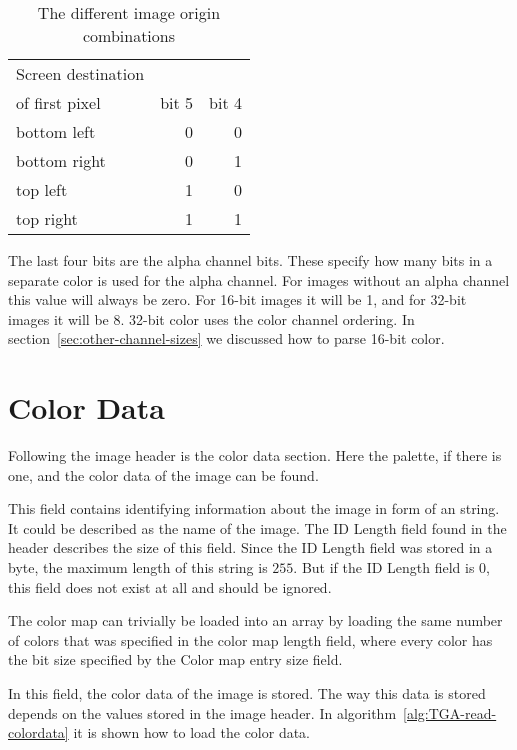\begin{table}
  \centering
  \begin{tabular}{lrr}
    \toprule
    Screen destination \\ of first pixel & bit 5 & bit 4 \\
    \midrule
    bottom left & 0 & 0 \\
    bottom right & 0 & 1 \\
    top left & 1 & 0 \\
    top right & 1 & 1 \\
    \bottomrule
  \end{tabular}
  \caption{The different image origin combinations}
  \label{tab:image-origin}
\end{table}

The last four bits are the alpha channel bits. These specify how many
bits in a separate color is used for the alpha channel. For images
without an alpha channel this value will always be zero. For 16-bit
images it will be 1, and for 32-bit images it will be 8. 32-bit color
uses the \argb color channel ordering. In section~\ref{sec:other-channel-sizes} we discussed how to parse 16-bit color.

\section{Color Data}
\label{sec:color-data}

Following the image header is the color data section. Here the
palette, if there is one, and the color data of the image can be
found.


This field contains identifying information about the image in form of
an \ascii string. It could be described as the name of the image. The
ID Length field found in the header describes the size of this
field. Since the ID Length field was stored in a byte, the maximum
length of this string is $255$. But if the ID Length field is 0, this
field does not exist at all and should be ignored.


The color map can trivially be loaded into an array by loading the
same number of colors that was specified in the color map length
field, where every color has the bit size specified by the Color map
entry size field.


In this field, the color data of the image is stored. The way this
data is stored depends on the values stored in the image header. In
algorithm~\ref{alg:TGA-read-colordata} it is shown how to load the
color data.

